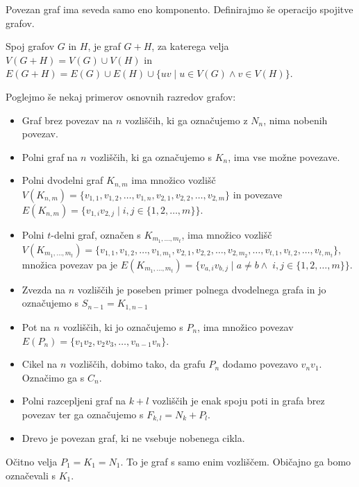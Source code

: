 \documentclass[mat1, tisk]{fmfdelo}
\newcommand{\1}{(1, 1, \ldots, 1)}
\newcommand{\2}{(2, 2, \ldots, 2)}
\begin{document}
Povezan graf ima seveda samo eno komponento. Definirajmo še operacijo spojitve grafov.

\begin{definicija} \label{def:spoj}
    Spoj grafov $G$ in $H$, je graf $G + H$, za katerega velja $V(G + H) = V(G) \cup V(H)$ 
    in $E(G + H)  = E(G) \cup E(H) \cup \{ uv \;  | \;  u \in V(G) \land v \in V(H) \}.$
\end{definicija}

Poglejmo še nekaj primerov osnovnih razredov grafov:
\begin{itemize} \label{razredi_grafov}
    \item Graf brez povezav na $n$ vozliščih, ki ga označujemo z $N_n$, nima nobenih povezav. 
    \item Polni graf na $n$ vozliščih, ki ga označujemo s $K_n$, ima vse možne povezave.
    \item Polni dvodelni graf $K_{n, m}$ ima množico 
    vozlišč $V(K_{n,m}) = \{ v_{1, 1}, v_{1, 2}, \ldots , v_{1, n},  \allowbreak v_{2, 1}, v_{2, 2}, \ldots , v_{2, m} \}$
    in povezave $E(K_{n, m}) = \{ v_{1, i} v_{2, j} \; | \; i, j \in \{ 1, 2, \ldots , m \} \}.$ 
    \item  Polni $t$-delni graf, označen s $K_{m_1, \ldots, m_t}$, ima množico 
    vozlišč $V(K_{m_1, \ldots, m_t}) = \{ v_{1, 1}, v_{1, 2}, \ldots , v_{1, m_1}, 
     v_{2, 1}, v_{2, 2}, \ldots , v_{2, m_2}, \ldots , v_{t, 1}, v_{t, 2}, \ldots , v_{t, m_t}\}$,
    množica povezav pa je $E(K_{m_1, \ldots, m_t}) = \{  v_{a, i} v_{b, j} \; | \; a \neq b \land \; 
    i, j \in \{ 1, 2, \ldots , m \} \}.$
    \item Zvezda na $n$ vozliščih je poseben primer polnega dvodelnega grafa in jo označujemo
    s $S_{n-1} = K_{1, n-1}$
    \item Pot na $n$ vozliščih, ki jo označujemo s $P_n$, ima množico povezav 
    $E(P_n) = \{ v_1 v_2 , v_2 v_3 , \ldots , v_{n-1} v_n\}.$
    \item Cikel na $n$ vozliščih, dobimo tako, da grafu $P_n$ dodamo povezavo $v_n v_1$. Označimo ga s $C_n$.
    \item Polni razcepljeni graf na $k+l$ vozliščih je enak spoju poti in grafa brez povezav ter ga 
    označujemo s $F_{k,l} = N_k + P_l.$
    \item Drevo je povezan graf, ki ne vsebuje nobenega cikla.
\end{itemize}

\begin{opomba}
    Očitno velja $P_1 = K_1 = N_1.$ To je graf s samo enim vozliščem. Običajno ga bomo
    označevali s $K_1.$
\end{opomba}
\end{document}

